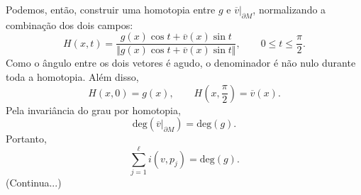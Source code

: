 \documentclass[../differential_topology.tex]{subfiles}
\begin{document}
\begin{proof*}
	Podemos, então, construir uma homotopia entre \(g\) e \(\overline v|_{\partial M}\), normalizando a combinação dos dois campos:
	\[
		H(x,t)=\frac{g(x)\cos t+\overline v(x)\sin t}
		{\Vert g(x)\cos t+\overline v(x)\sin t\Vert},
		\qquad 0\leq t\leq\frac{\pi}{2}.
	\]
	Como o ângulo entre os dois vetores é agudo, o denominador é não nulo durante toda a homotopia. Além disso,
	\[
		H(x,0)=g(x),\qquad H\left(x,\frac{\pi}{2}\right)=\overline v(x).
	\]
	Pela invariância do grau por homotopia,
	\[
		\mathrm{deg}(\overline v|_{\partial M})=\mathrm{deg}(g).
	\]
	Portanto,
	\[
		\boxed{\sum_{j=1}^{\ell}i(v,p_j)=\mathrm{deg}(g).}
	\]
	(Continua...)
\end{proof*}
\end{document}
